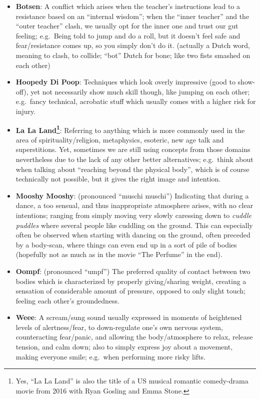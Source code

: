 \begin{itemize}
    \item \textbf{Botsen}: A conflict which arises when the teacher's instructions lead to a resistance based on an ``internal wisdom''; when the ``inner teacher'' and the ``outer teacher'' clash, we usually opt for the inner one and trust our gut feeling; e.g.\ Being told to jump and do a roll, but it doesn't feel safe and fear/resistance comes up, so you simply don't do it.
    (actually a Dutch word, meaning to clash, to collide; ``bot'' Dutch for bone; like two fists smashed on each other)
    \item \textbf{Hoopedy Di Poop}: Techniques which look overly impressive (good to show-off), yet not necessarily show much skill though, like jumping on each other; e.g.\ fancy technical, acrobatic stuff which usually comes with a higher risk for injury.
    \item \textbf{La La Land\footnote{Yes, ``La La Land'' is also the title of a US musical romantic comedy-drama movie from 2016 with Ryan Gosling and Emma Stone.}}: Referring to anything which is more commonly used in the area of spirituality/religion, metaphysics, esoteric, new age talk and superstitions.
    Yet, sometimes we are still using concepts from those domains nevertheless due to the lack of any other better alternatives; e.g.\ think about when talking about ``reaching beyond the physical body'', which is of course technically not possible, but it gives the right image and intention.
    \item \textbf{Mooshy Mooshy}: (pronounced ``muschi muschi'') Indicating that during a dance, a too sensual, and thus inappropriate atmosphere arises, with no clear intentions; ranging from simply moving very slowly caressing down to \textit{cuddle puddles} where several people like cuddling on the ground.
    This can especially often be observed when starting with dancing on the ground, often preceded by a body-scan, where things can even end up in a sort of pile of bodies (hopefully not as much as in the movie ``The Perfume'' in the end).
    \item \textbf{Oompf}: (pronounced ``umpf'') The preferred quality of contact between two bodies which is characterized by properly giving/sharing weight, creating a sensation of considerable amount of pressure, opposed to only slight touch; feeling each other's groundedness.
    \item \textbf{Weee}: A scream/sung sound usually expressed in moments of heightened levels of alertness/fear, to down-regulate one's own nervous system, counteracting fear/panic, and allowing the body/atmosphere to relax, release tension, and calm down; also to simply express joy about a movement, making everyone smile; e.g.\ when performing more risky lifts.
\end{itemize}

